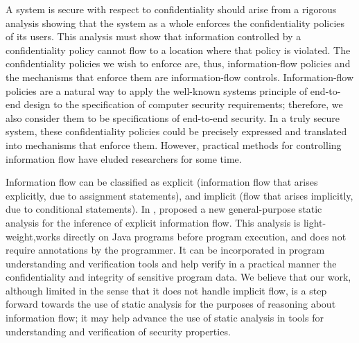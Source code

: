 A system is secure with respect to confidentiality
should arise from a rigorous analysis showing that the system
as a whole enforces the confidentiality policies of its users.
This analysis must show that information controlled by a confidentiality policy cannot flow to a location where that policy
is violated. The confidentiality policies we wish to enforce
are, thus, information-flow policies and the mechanisms that
enforce them are information-flow controls. Information-flow
policies are a natural way to apply the well-known systems
principle of end-to-end design \cite{ref_89_saltzer1984end} to the specification of
computer security requirements; therefore, we also consider
them to be specifications of end-to-end security. In a truly
secure system, these confidentiality policies could be precisely
expressed and translated into mechanisms that enforce them.
However, practical methods for controlling information flow
have eluded researchers for some time.

Information flow can be classified as explicit (information flow
that arises explicitly, due to assignment statements), and implicit
(flow that arises implicitly, due to conditional statements). In \cite{ref_90_liu2008static}, proposed a new general-purpose static analysis for the inference
of explicit information flow. This analysis is light-weight,works directly on Java programs before program execution, and
does not require annotations by the programmer. It can be incorporated
in program understanding and verification tools and help
verify in a practical manner the confidentiality and integrity of sensitive program data. We believe that our work, although limited in
the sense that it does not handle implicit flow, is a step forward towards
the use of static analysis for the purposes of reasoning about
information flow; it may help advance the use of static analysis in
tools for understanding and verification of security properties.


